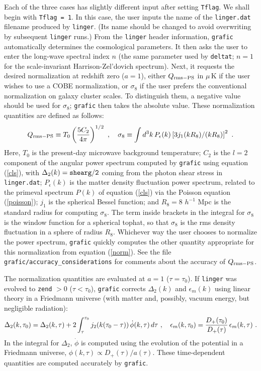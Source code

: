 Each of the three cases has slightly different input after setting
{\tt Tflag}.  We shall begin with {\tt Tflag = 1}.  In this case, the
user inputs the name of the {\tt linger.dat} filename produced by
{\tt linger}.  (Its name should be changed to avoid overwriting
by subsequent {\tt linger} runs.)  From the {\tt linger} header
information, {\tt grafic} automatically determines the cosmological
parameters.  It then asks the user to enter the long-wave spectral
index $n$ (the same parameter used by {\tt deltat}; $n=1$ for the
scale-invariant Harrison-Zel'dovich spectrum).  Next, it requests the
desired normalization at redshift zero ($a=1$), either $Q_{\rm rms-PS}$
in $\mu\,$K if the user wishes to use a COBE normalization, or
$\sigma_8$ if the user prefers the conventional normalization on
galaxy cluster scales.  To distinguish them, a negative value should
be used for $\sigma_8$; {\tt grafic} then takes the absolute value.
These normalization quantities are defined as follows:
\begin{equation}
\label{norm}
  Q_{\rm rms-PS}\equiv T_0\left(5C_2\over4\pi\right)^{1/2}\ ,\quad
  \sigma_8\equiv\int d^3k\,P_\epsilon(k)\left[3j_1(kR_8)/(kR_8)\right]^2\ .
\end{equation} 
Here, $T_0$ is the present-day microwave background temperature;
$C_2$ is the $l=2$ component of the angular power spectrum computed
by {\tt grafic} using equation (\ref{cls}), with $\Delta_2(k)={\tt
shearg/2}$ coming from the photon shear stress in {\tt linger.dat};
$P_\epsilon(k)$ is the matter density fluctuation power spectrum,
related to the primeval spectrum $P(k)$ of equation (\ref{cls}) via the
Poisson equation (\ref{poisson}); $j_1$ is the spherical Bessel function;
and $R_8=8$ $h^{-1}$ Mpc is the standard radius for computing $\sigma_8$.
The term inside brackets in the integral for $\sigma_8$ is the window
function for a spherical tophat, so that $\sigma_8$ is the rms density
fluctuation in a sphere of radius $R_8$.  Whichever way the user chooses
to normalize the power spectrum, {\tt grafic} quickly computes the other
quantity appropriate for this normalization from equation (\ref{norm}).
See the file {\tt grafic/accuracy\_considerations} for comments about the
accuracy of $Q_{\rm rms-PS}$.

The normalization quantities are evaluated at $a=1$ ($\tau=\tau_0$).
If {\tt linger} was evolved to {\tt zend} $>0$ ($\tau<\tau_0$), {\tt grafic}
corrects $\Delta_2(k)$ and $\epsilon_m(k)$ using linear theory in a
Friedmann universe (with matter and, possibly, vacuum energy, but
negligible radiation):
\begin{equation}
\label{z0corr}
  \Delta_2(k,\tau_0)=\Delta_2(k,\tau)+2\int_\tau^{\tau_0}
    j_2(k(\tau_0-\tau))\,\dot\phi(k,\tau)\,d\tau\ ,\quad
  \epsilon_m(k,\tau_0)={D_+(\tau_0)\over D_+(\tau)}\,\epsilon_m(k,\tau)\ .
\end{equation}
In the integral for $\Delta_2$, $\dot\phi$ is computed using the evolution
of the potential in a Friedmann universe, $\phi(k,\tau)\propto D_+(\tau)/
a(\tau)$.  These time-dependent quantities are computed accurately by
{\tt grafic}.

